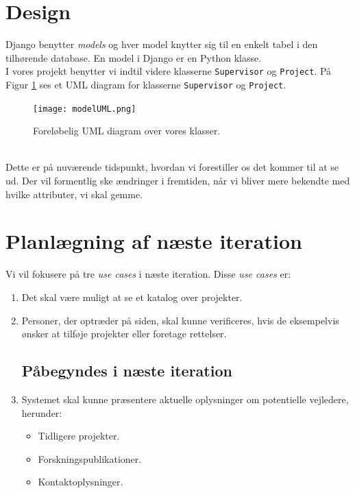 \documentclass[11pt]{article}
\begin{document}
\section{Design}
Django benytter \textit{models} og hver model knytter sig til en enkelt tabel i den tilhørende database. En model i Django er en Python klasse. \\ I vores projekt benytter vi indtil videre klasserne \texttt{Supervisor} og \texttt{Project}. På Figur \ref{fig:modelUML} ses et UML diagram for klasserne \texttt{Supervisor} og \texttt{Project}.

\begin{figure}[H]
			\centering
			\texttt{[image: modelUML.png]}
			\caption{Foreløbelig UML diagram over vores klasser.}
			\label{fig:modelUML}
\end{figure}
~\\
Dette er på nuværende tidspunkt, hvordan vi forestiller os det kommer til at se ud. Der vil formentlig ske ændringer i fremtiden, når vi bliver mere bekendte med hvilke attributer, vi skal gemme.

\section{Planlægning af næste iteration}
Vi vil fokusere på tre \textit{use cases} i næste iteration. Disse \textit{use cases} er:
\begin{enumerate}
\subsection*{Forventes implementeret i næste iteration}
	\item \label{enum:katalog} Det skal være muligt at se et katalog over projekter.

	\item \label{enum:verifikation} Personer, der optræder på siden, skal kunne verificeres, hvis de eksempelvis ønsker at tilføje projekter eller foretage rettelser.

\subsection*{Påbegyndes i næste iteration}

	\item \label{enum:vejlederInfo} Systemet skal kunne præsentere aktuelle oplysninger om potentielle vejledere, herunder:
	\begin{itemize}
		\item Tidligere projekter.
		\item Forskningspublikationer.
		\item Kontaktoplysninger.
	\end{itemize}
\end{enumerate}
\end{document}
